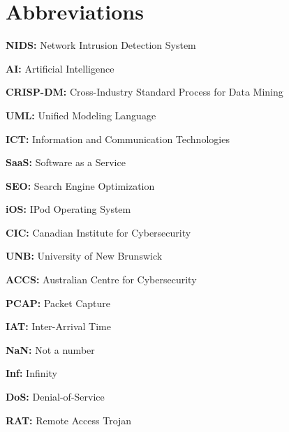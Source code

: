 \chapter*{Abbreviations}
\vskip1cm
\begingroup

\setlength{\parindent}{0pt}

\textbf{NIDS:} Network Intrusion Detection System

\vskip0.7cm

\textbf{AI:} Artificial Intelligence

\vskip0.7cm

\textbf{CRISP-DM:} Cross-Industry Standard Process for Data Mining

\vskip0.7cm

\textbf{UML:} Unified Modeling Language

\vskip0.7cm

\textbf{ICT:}  Information and Communication Technologies

\vskip0.7cm

\textbf{SaaS:} Software as a Service

\vskip0.7cm

\textbf{SEO:} Search Engine Optimization

\vskip0.7cm

\textbf{iOS:}  IPod Operating System

\vskip0.7cm

\textbf{CIC:} Canadian Institute for Cybersecurity

\vskip0.7cm

\textbf{UNB:} University of New Brunswick

\vskip0.7cm

\textbf{ACCS:} Australian Centre for Cybersecurity

\vskip0.7cm

\textbf{PCAP:} Packet Capture

\vskip0.7cm

\textbf{IAT:} Inter-Arrival Time

\vskip0.7cm

\textbf{NaN:} Not a number

\vskip0.7cm

\textbf{Inf:} Infinity

\vskip0.7cm

\textbf{DoS:} Denial-of-Service

\vskip0.7cm

\textbf{RAT:} Remote Access Trojan

\vskip0.7cm

